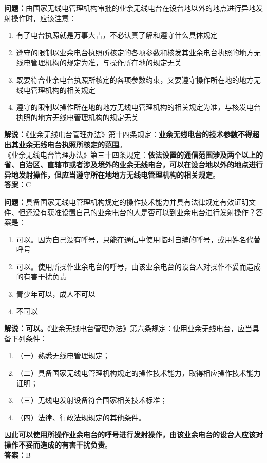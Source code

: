 \noindent\textbf{问题：}由国家无线电管理机构审批的业余无线电台在设台地以外的地点进行异地发射操作时，应该注意：
\begin{enumerate}[label=\Alph*), leftmargin=3em]
	\item 有了电台执照就是万事大吉，不必认真了解和遵守什么具体规定
	\item 遵守的限制以业余电台执照所核定的各项参数和核发其业余电台执照的地方无线电管理机构的规定为准，与操作所在地的规定无关
	\item 既要符合业余电台执照所核定的各项参数约束，又要遵守操作所在地的地方无线电管理机构的相关规定
	\item 遵守的限制以操作所在地的地方无线电管理机构的相关规定为准，与核发电台执照的地方无线电管理机构的规定无关
\end{enumerate}
\noindent\textbf{解说：}《业余无线电台管理办法》第十四条规定：\textbf{业余无线电台的技术参数不得超出其业余无线电台执照所核定的范围}。\\
《业余无线电台管理办法》第三十四条规定：\textbf{依法设置的通信范围涉及两个以上的省、自治区、直辖市或者涉及境外的业余无线电台，可以在设台地以外的地点进行异地发射操作，但应当遵守所在地地方无线电管理机构的相关规定}。\\\noindent\textbf{答案：}C




\bigskip


\noindent\textbf{问题：}具备国家无线电管理机构规定的操作技术能力并具有法律规定有效证明文件、但还没有获准设置自己的业余电台的人是否可以到业余电台进行发射操作？答案是：
\begin{enumerate}[label=\Alph*), leftmargin=3em]
	\item 可以。因为自己没有呼号，只能在通信中使用临时自编的呼号，或用姓名代替呼号
	\item 可以。使用所操作业余电台的呼号，由该业余电台的设台人对操作不妥而造成的有害干扰负责
	\item 青少年可以，成人不可以
	\item 不可以
\end{enumerate}
\noindent\textbf{解说：可以。}《业余无线电台管理办法》第六条规定：使用业余无线电台，应当具备下列条件：
\begin{enumerate}[label=, leftmargin=3em]
	\item （一）熟悉无线电管理规定；
	\item （二）具备国家无线电管理机构规定的操作技术能力，取得相应操作技术能力证明；
	\item （三）无线电发射设备符合国家相关技术标准；
	\item （四）法律、行政法规规定的其他条件。
\end{enumerate}
因此\textbf{可以使用所操作业余电台的呼号进行发射操作，由该业余电台的设台人应该对操作不妥而造成的有害干扰负责}。\\\noindent\textbf{答案：}B


